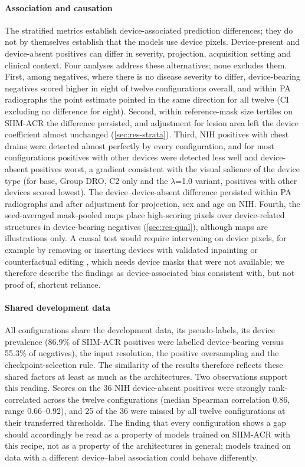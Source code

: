 \documentclass{ieeeaccess}
\begin{document}
\paragraph{Association and causation}
The stratified metrics establish device-associated prediction differences; they do not by themselves establish that the models use device pixels. Device-present and device-absent positives can differ in severity, projection, acquisition setting and clinical context. Four analyses address these alternatives; none excludes them. First, among negatives, where there is no disease severity to differ, device-bearing negatives scored higher in eight of twelve configurations overall, and within PA radiographs the point estimate pointed in the same direction for all twelve (CI excluding no difference for eight). Second, within reference-mask size tertiles on SIIM-ACR the difference persisted, and adjustment for lesion area left the device coefficient almost unchanged (\cref{sec:res-strata}). Third, NIH positives with chest drains were detected almost perfectly by every configuration, and for most configurations positives with other devices were detected less well and device-absent positives worst, a gradient consistent with the visual salience of the device type (for base, Group DRO, C2 only and the $\lambda$=1.0 variant, positives with other devices scored lowest). The device--device-absent difference persisted within PA radiographs and after adjustment for projection, sex and age on NIH. Fourth, the seed-averaged mask-pooled maps place high-scoring pixels over device-related structures in device-bearing negatives (\cref{sec:res-qual}), although maps are illustrations only. A causal test would require intervening on device pixels, for example by removing or inserting devices with validated inpainting or counterfactual editing \cite{cooke2026roentmod}, which needs device masks that were not available; we therefore describe the findings as device-associated bias consistent with, but not proof of, shortcut reliance.

\paragraph{Shared development data}
All configurations share the development data, its pseudo-labels, its device prevalence (86.9\% of SIIM-ACR positives were labelled device-bearing versus 55.3\% of negatives), the input resolution, the positive oversampling and the checkpoint-selection rule. The similarity of the results therefore reflects these shared factors at least as much as the architectures. Two observations support this reading. Scores on the 36 NIH device-absent positives were strongly rank-correlated across the twelve configurations (median Spearman correlation 0.86, range 0.66--0.92), and 25 of the 36 were missed by all twelve configurations at their transferred thresholds. The finding that every configuration shows a gap should accordingly be read as a property of models trained on SIIM-ACR with this recipe, not as a property of the architectures in general; models trained on data with a different device--label association could behave differently.
\end{document}
